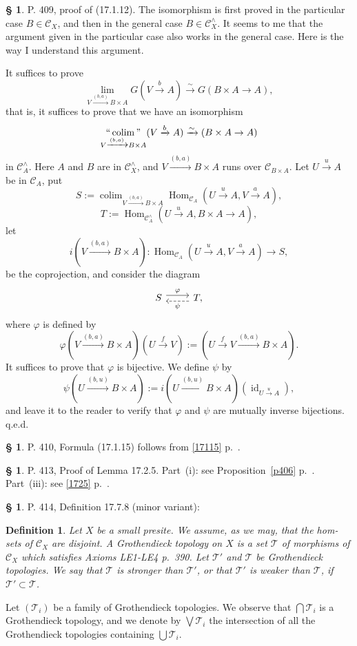\documentclass[12pt]{article}
\newtheorem{df}[thm]{Definition}%
\theoremstyle{remark}
\theoremstyle{definition}
\newtheorem{s}[thm]{\S}
\newcommand{\cc}{\mathcal}
\newcommand{\C}{\mathcal C}
\newcommand{\xr}{\xrightarrow}
\newcommand{\mv}{ (minor variant)}
\DeclareMathOperator*{\coli}{colim}
\DeclareMathOperator*{\co}{colim}
\DeclareMathOperator*{\ic}{``\coli"}
\DeclareMathOperator{\id}{id}
\DeclareMathOperator{\Hom}{Hom}%
\begin{document}
%
%
\begin{s} 
P. 409, proof of (17.1.12). The isomorphism is first proved in the particular case $B\in\C_X$, and then in the general case $B\in\C_X^\wedge$. It seems to me that the argument given in the particular case also works in the general case. Here is the way I understand this argument. 

It suffices to prove 
$$
\lim_{V\xr{(b,a)}B\times A}G(V\xr b A)\xr\sim G(B\times A\to A),
$$
that is, it suffices to prove that we have an isomorphism 
$$
\ic_{V\xr{(b,a)}B\times A}(V\xr b A)\xr\sim(B\times A\to A)
$$ 
in $\C_A^\wedge$. Here $A$ and $B$ are in $\C_X^\wedge$, and $V\xr{(b,a)}B\times A$ runs over $\C_{B\times A}$. Let $U\xr u A$ be in $\C_A$, put 
$$
S:=\displaystyle\co_{V\xr{(b,a)}B\times A}\Hom_{\C_A}(U\xr u A,V\xr a A),
$$ 
$$
T:=\Hom_{\C_A^\wedge}(U\xr u A,B\times A\to A),
$$ 
let 
$$
i(V\xr{(b,a)}B\times A):\Hom_{\C_A}(U\xr u A,V\xr a A)\to S,
$$ 
be the coprojection, and consider the diagram 
$$
\begin{tikzcd}
%
S\ar[yshift=.7ex]{r}{\varphi}&T,\ar[yshift=-.7ex,dashed]{l}{\psi}
%
\end{tikzcd}
$$ 
where $\varphi$ is defined by 
$$
\varphi(V\xr{(b,a)}B\times A)(U\xr fV):=(U\xr fV\xr{(b,a)}B\times A).
$$
It suffices to prove that $\varphi$ is bijective. We define $\psi$ by 
$$
\psi(U\xr{(b,u)}B\times A):=i(U\xr{(b,u)}B\times A)(\id_{U\xr uA}),
$$ 
and leave it to the reader to verify that $\varphi$ and $\psi$ are mutually inverse bijections. q.e.d.
\end{s}
%
%
\begin{s}\label{17115b}
P. 410, Formula (17.1.15) follows from \eqref{17115} p.~\pageref{17115}.
\end{s}
%
%
\begin{s}\label{1725b}
P. 413, Proof of Lemma 17.2.5. Part~(i): see Proposition~\ref{p406} p.~\pageref{p406}. Part~(iii): see \eqref{1725} p.~\pageref{1725}.
\end{s}
%
%
\begin{s} 
P. 414, Definition 17.7.8\mv:
%
\begin{df}\label{1778}
Let $X$ be a small presite. We assume, as we may, that the hom-sets of $\C_X$ are disjoint. A {\em Grothendieck topology} on $X$ is a set $\cc T$ of morphisms of $\C_X$ which satisfies Axioms LE1-LE4 p.~390. Let $\cc T'$ and $\cc T$ be Grothendieck topologies. We say that $\cc T$ is {\em stronger than} $\cc T'$, or that $\cc T'$ is {\em weaker than} $\cc T$, if $\cc T'\subset\cc T$. 
\end{df}
%
Let $(\cc T_i)$ be a family of Grothendieck topologies. We observe that $\bigcap\cc T_i$ is a Grothendieck topology, and we denote by $\bigvee\cc T_i$ the intersection of all the Grothendieck topologies containing $\bigcup\cc T_i$.
\end{s}
\end{document}
